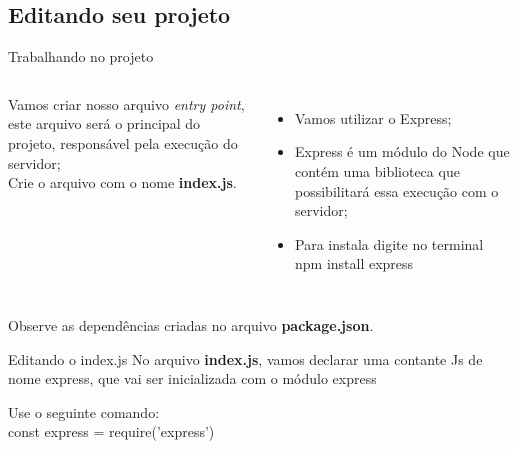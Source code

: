 \documentclass{beamer}
\begin{document}
 \subsection{Editando seu projeto}
    \begin{frame}{Trabalhando no projeto}
      \begin{columns}[onlytextwidth]
         Vamos criar nosso arquivo \textit{entry point}, este arquivo será o principal do projeto, responsável pela execução do servidor;\\
        
          \vspace{0.5cm}
	Crie o arquivo com o nome \textbf{index.js}.
            \pause
            \begin{itemize}
		\item Vamos utilizar o Express;
		\item Express é um módulo do Node que contém uma biblioteca que possibilitará essa execução com o servidor;
		\item Para instala digite no terminal \alert{ npm install express}
	\end{itemize}
      \end{columns}
      Observe as dependências criadas no arquivo \textbf{package.json}.
    \end{frame}
    
    \begin{frame}{Editando o index.js}
	No arquivo \textbf{index.js}, vamos declarar uma contante Js de nome express, que vai ser inicializada com o módulo express
	
          \vspace{0.5cm}
          Use o seguinte comando:\\
          \alert{const express = require('express') }          
          
    \end{frame}
    
\end{document}
